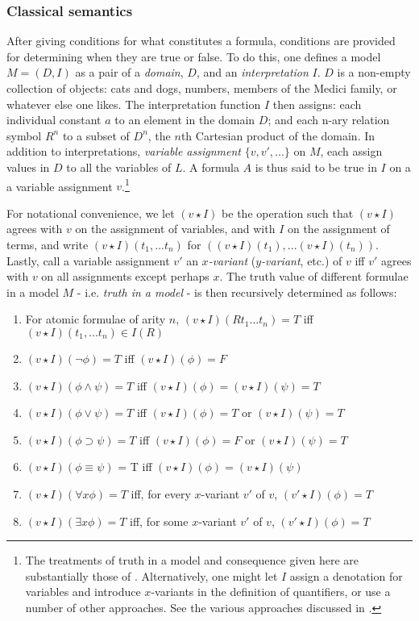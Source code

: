 \documentclass[]{article}
\begin{document}
\subsubsection{Classical semantics}
After giving conditions for what constitutes a formula, conditions are provided for determining when they are true or false. To do this, one defines a model $M = (D, I)$ as a pair of a \textit{domain}, $D$, and an \textit{interpretation} $I$. $D$ is a non-empty collection of objects: cats and dogs, numbers, members of the Medici family, or whatever else one likes. The interpretation function $I$ then assigns: each individual constant $a$ to an element in the domain $D$; and each n-ary relation symbol $R^{n}$ to a subset of $D^{n}$, the $n$th Cartesian product of the domain. In addition to interpretations, \textit{variable assignment} $\{v, v', ...\}$ on $M$, each assign values in $D$ to all the variables of $L$. A formula $A$ is thus said to be true in $I$ on a a variable assignment $v$.\footnote{The treatments of truth in a model and consequence given here are substantially those of \autocite{Fitting1998}. Alternatively, one might let $I$ assign a denotation for variables and introduce $x$-variants in the definition of quantifiers, or use a number of other approaches. See the various approaches discussed in \autocite{Garson2013b}.}

For notational convenience, we let $(v \star I)$ be the operation such that $(v \star I)$ agrees with $v$ on the assignment of variables, and with $I$ on the assignment of terms, and write $(v \star I)(t_{1}, ...t_{n})$ for $((v \star I)(t_{1}), ... (v \star I)(t_{n}))$. Lastly, call a variable assignment $v'$ an \textit{$x$-variant} (\textit{$y$-variant}, etc.) of $v$ iff $v'$ agrees with $v$ on all assignments except perhaps $x$. The truth value of different formulae in a model $M$ - i.e. \textit{truth in a model} - is then recursively determined as follows:

\begin{enumerate}
	\item For atomic formulae of arity $n$, $(v \star I)(Rt_{1}...t_{n}) = T$ iff $(v \star I)(t_{1}, ... t_{n}) \in I(R)$
	\item $(v \star I)(\neg\phi) = T$ iff $(v \star I)(\phi) = F$
	\item $(v \star I)(\phi \wedge \psi) = T$ iff $(v \star I)(\phi) = (v \star I)(\psi) = T$
	\item $(v \star I)(\phi \vee \psi) = T$ iff $(v \star I)(\phi) = T$ or $(v \star I)(\psi) = T$
	\item $(v \star I)(\phi \supset \psi) = T$ iff $(v \star I)(\phi) = F$ or $(v \star I)(\psi) = T$
	\item $(v \star I)(\phi \equiv \psi)$ = T iff $(v \star I)(\phi) = (v \star I)(\psi)$
	\item $(v \star I)(\forall x \phi) = T$ iff, for every $x$-variant $v'$ of $v$, $(v' \star I)(\phi) = T$
	\item $(v \star I)(\exists x \phi) = T$ iff, for some $x$-variant $v'$ of $v$, $(v' \star I)(\phi) = T$
\end{enumerate}
\end{document}

